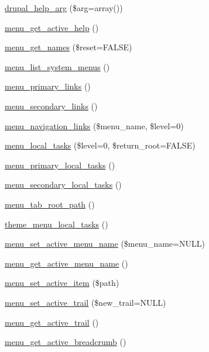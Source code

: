 \begin{CompactItemize}
\item 
\hyperlink{group__menu_g00dce79e81030a75c94c7a279794b253}{drupal\_\-help\_\-arg} (\$arg=array())
\item 
\hyperlink{group__menu_g21c6572391132f4e1f5b3fd108220bf4}{menu\_\-get\_\-active\_\-help} ()
\item 
\hyperlink{group__menu_gb537c9640c2d63c4c5208412987d7045}{menu\_\-get\_\-names} (\$reset=FALSE)
\item 
\hyperlink{group__menu_g28e765ff428a3f18978af564ee0147d6}{menu\_\-list\_\-system\_\-menus} ()
\item 
\hyperlink{group__menu_g472245ad15500b2f7b253f679afd90c7}{menu\_\-primary\_\-links} ()
\item 
\hyperlink{group__menu_gea7d8f0da28d4082b03e6cadf7af69bd}{menu\_\-secondary\_\-links} ()
\item 
\hyperlink{group__menu_gb4cdacc813ae9e06271aa4aa2d9495a7}{menu\_\-navigation\_\-links} (\$menu\_\-name, \$level=0)
\item 
\hyperlink{group__menu_g6641ad95c6f964fbdc3f594d86696569}{menu\_\-local\_\-tasks} (\$level=0, \$return\_\-root=FALSE)
\item 
\hyperlink{group__menu_g83613b83f90d6a12e2f4170ed0ede9b1}{menu\_\-primary\_\-local\_\-tasks} ()
\item 
\hyperlink{group__menu_gbf84c295da2c986cd8ad305935e31ffb}{menu\_\-secondary\_\-local\_\-tasks} ()
\item 
\hyperlink{group__menu_gcf647362fc7151bbaa1dbe5568a0b6b5}{menu\_\-tab\_\-root\_\-path} ()
\item 
\hyperlink{group__themeable_g11a9f127932a0b272cc0c0dabb4e7d0b}{theme\_\-menu\_\-local\_\-tasks} ()
\item 
\hyperlink{group__menu_g017400eafe570a87460d4e6a4a305407}{menu\_\-set\_\-active\_\-menu\_\-name} (\$menu\_\-name=NULL)
\item 
\hyperlink{group__menu_g7f449034a05c47e985f5ce8ec31344e2}{menu\_\-get\_\-active\_\-menu\_\-name} ()
\item 
\hyperlink{group__menu_gcdd22102c2ba6545645ae34be563d1d4}{menu\_\-set\_\-active\_\-item} (\$path)
\item 
\hyperlink{group__menu_g9328a9a4f297d8bb095d924e75a8abd7}{menu\_\-set\_\-active\_\-trail} (\$new\_\-trail=NULL)
\item 
\hyperlink{group__menu_g55105d602c5c5ea5b39aae25aa47f8c5}{menu\_\-get\_\-active\_\-trail} ()
\item 
\hyperlink{group__menu_g009731c4b3e736ebb620ba90e7f04207}{menu\_\-get\_\-active\_\-breadcrumb} ()

\end{CompactItemize}
